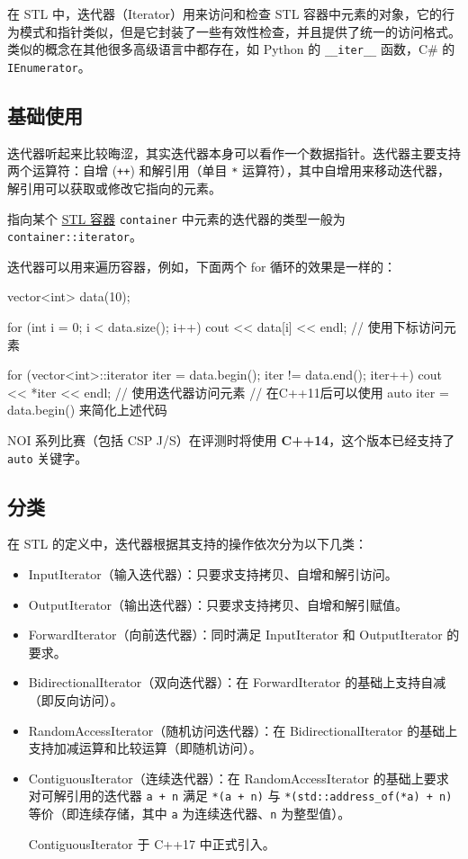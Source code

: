 在 STL 中，迭代器（Iterator）用来访问和检查 STL 容器中元素的对象，它的行为模式和指针类似，但是它封装了一些有效性检查，并且提供了统一的访问格式。类似的概念在其他很多高级语言中都存在，如 Python 的 \texttt{\_\_iter\_\_} 函数，C\# 的 \texttt{IEnumerator}。

\subsection{基础使用}\label{ux57faux7840ux4f7fux7528}

迭代器听起来比较晦涩，其实迭代器本身可以看作一个数据指针。迭代器主要支持两个运算符：自增 (\texttt{++}) 和解引用（单目 \texttt{*} 运算符），其中自增用来移动迭代器，解引用可以获取或修改它指向的元素。

指向某个 \href{./container.md}{STL 容器} \texttt{container} 中元素的迭代器的类型一般为 \texttt{container::iterator}。

迭代器可以用来遍历容器，例如，下面两个 for 循环的效果是一样的：


\begin{codeline}
vector<int> data(10);

for (int i = 0; i < data.size(); i++)
  cout << data[i] << endl;  // 使用下标访问元素

for (vector<int>::iterator iter = data.begin(); iter != data.end(); iter++)
  cout << *iter << endl;  // 使用迭代器访问元素
// 在C++11后可以使用 auto iter = data.begin() 来简化上述代码
\end{codeline}


NOI 系列比赛（包括 CSP J/S）在评测时将使用 \textbf{C++14}，这个版本已经支持了 \texttt{auto} 关键字。

\subsection{分类}\label{ux5206ux7c7b}

在 STL 的定义中，迭代器根据其支持的操作依次分为以下几类：

\begin{itemize}
\item
  InputIterator（输入迭代器）：只要求支持拷贝、自增和解引访问。
\item
  OutputIterator（输出迭代器）：只要求支持拷贝、自增和解引赋值。
\item
  ForwardIterator（向前迭代器）：同时满足 InputIterator 和 OutputIterator 的要求。
\item
  BidirectionalIterator（双向迭代器）：在 ForwardIterator 的基础上支持自减（即反向访问）。
\item
  RandomAccessIterator（随机访问迭代器）：在 BidirectionalIterator 的基础上支持加减运算和比较运算（即随机访问）。
\item
  ContiguousIterator（连续迭代器）：在 RandomAccessIterator 的基础上要求对可解引用的迭代器 \texttt{a\ +\ n} 满足 \texttt{*(a\ +\ n)} 与 \texttt{*(std::address\_of(*a)\ +\ n)} 等价（即连续存储，其中 \texttt{a} 为连续迭代器、\texttt{n} 为整型值）。

  ContiguousIterator 于 C++17 中正式引入。
\end{itemize}

